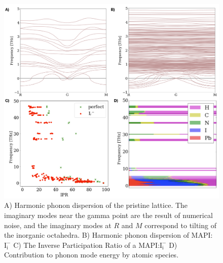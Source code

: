\begin{figure}[h!]   
\centering
  \includegraphics[width=1.0\columnwidth]{figures/ch6/defect_dispersion_IPR.png}
  \caption[Phonon dispersion and Inverse Participation Ratio of $\mathrm{I}_\mathrm{i}^{-}$]{A) Harmonic phonon dispersion of the pristine lattice. The imaginary modes near the gamma point are the result of numerical noise, and the imaginary modes at $R$ and $M$ correspond to tilting of the inorganic octahedra. B) Harmonic phonon dispersion of MAPI:$\mathrm{I}_\textrm{i}^{-}$ C) The Inverse Participation Ratio of a MAPI:$\mathrm{I}_\textrm{i}^{-}$ D) Contribution to phonon mode energy by atomic species.}
\label{defect_dispersion_IPR}
\end{figure}

